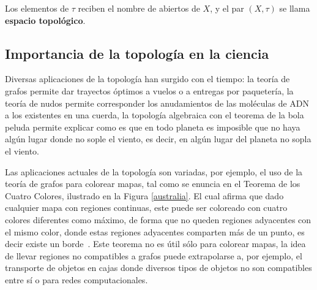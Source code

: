 Los elementos de $\tau$ reciben el nombre de abiertos de $X$, y el par
$(X,\tau)$ se llama \textbf{espacio topológico}.

\subsection{Importancia de la topología en la ciencia}

Diversas aplicaciones de la topología han surgido con el tiempo: la teoría de
grafos permite dar trayectos óptimos a vuelos o a entregas por paquetería, la
teoría de nudos permite corresponder los anudamientos de las moléculas de ADN a
los existentes en una cuerda, la topología algebraica con el teorema de la bola
peluda permite explicar como es que en todo planeta es imposible que no haya
algún lugar donde no sople el viento, es decir, en algún lugar del planeta no
sopla el viento.

Las aplicaciones actuales de la topología son variadas, por ejemplo, el uso de
la teoría de grafos para colorear mapas, tal como se enuncia en el Teorema de
los Cuatro Colores, ilustrado en la Figura \ref{australia}. El cual afirma que
dado cualquier mapa con regiones continuas, este puede ser coloreado con cuatro
colores diferentes como máximo, de forma que no queden regiones adyacentes con
el mismo color, donde estas regiones adyacentes comparten más de un punto, es
decir existe un borde~\cite{4colores}. Este teorema no es útil sólo para
colorear mapas, la idea de llevar regiones no compatibles a grafos puede
extrapolarse a, por ejemplo, el transporte de objetos en cajas donde diversos
tipos de objetos no son compatibles entre sí o para redes computacionales.

